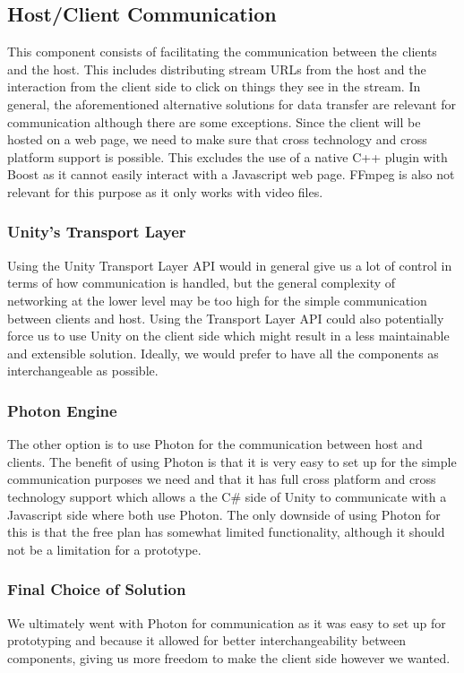 \subsection{Host/Client Communication} %
This component consists of facilitating the communication between the clients and the host. This includes distributing stream URLs from the host and the interaction from the client side to click on things they see in the stream. In general, the aforementioned alternative solutions for data transfer are relevant for communication although there are some exceptions. Since the client will be hosted on a web page, we need to make sure that cross technology and cross platform support is possible. This excludes the use of a native C++ plugin with Boost as it cannot easily interact with a Javascript web page. FFmpeg is also not relevant for this purpose as it only works with video files.  
    
\subsubsection{Unity's Transport Layer}
Using the Unity Transport Layer API would in general give us a lot of control in terms of how communication is handled, but the general complexity of networking at the lower level may be too high for the simple communication between clients and host. Using the Transport Layer API could also potentially force us to use Unity on the client side which might result in a less maintainable and extensible solution. Ideally, we would prefer to have all the components as interchangeable as possible. 
      
\subsubsection{Photon Engine}
The other option is to use Photon for the communication between host and clients. The benefit of using Photon is that it is very easy to set up for the simple communication purposes we need and that it has full cross platform and cross technology support which allows a the C\# side of Unity to communicate with a Javascript side where both use Photon. The only downside of using Photon for this is that the free plan has somewhat limited functionality, although it should not be a limitation for a prototype. 

\subsubsection{Final Choice of Solution}
We ultimately went with Photon for communication as it was easy to set up for prototyping and because it allowed for better interchangeability between components, giving us more freedom to make the client side however we wanted. 
    

